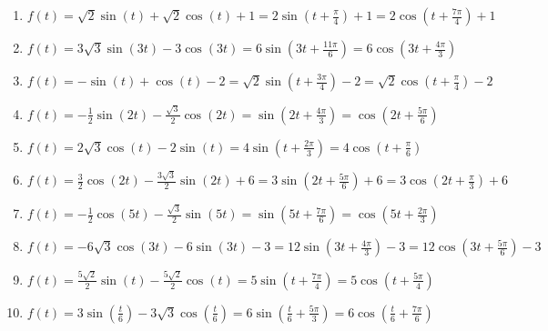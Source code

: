 \documentclass{ximera}
\begin{document}
\begin{enumerate}
\setcounter{enumi}{\value{HW}}
\item $f(t) = \sqrt{2}\sin(t) + \sqrt{2}\cos(t) + 1 = 2\sin\left(t + \frac{\pi}{4}\right) + 1 = 2\cos\left(t + \frac{7\pi}{4}\right) + 1$ 
\item $f(t) = 3\sqrt{3}\sin(3t) - 3\cos(3t) = 6\sin\left(3t + \frac{11\pi}{6}\right) = 6\cos\left(3t + \frac{4\pi}{3}\right)$
\item $f(t) = -\sin(t) + \cos(t) - 2 = \sqrt{2}\sin\left(t + \frac{3\pi}{4}\right) - 2 = \sqrt{2}\cos\left(t + \frac{\pi}{4}\right) - 2$
\item $f(t) = -\frac{1}{2}\sin(2t) - \frac{\sqrt{3}}{2}\cos(2t) = \sin\left(2t + \frac{4\pi}{3}\right) = \cos\left(2t + \frac{5\pi}{6}\right)$
\item $f(t) = 2\sqrt{3} \cos(t) - 2\sin(t) = 4\sin\left(t+\frac{2\pi}{3}  \right)  = 4\cos\left(t + \frac{\pi}{6}\right)$
\item  $f(t) = \frac{3}{2} \cos(2t) - \frac{3\sqrt{3}}{2} \sin(2t) + 6 =3\sin\left(2t + \frac{5\pi}{6}\right) + 6   = 3\cos\left(2t + \frac{\pi}{3}\right) + 6$
\item  $f(t) = -\frac{1}{2} \cos(5t) -\frac{\sqrt{3}}{2} \sin(5t) =  \sin\left(5t + \frac{7\pi}{6}\right) = \cos\left(5t + \frac{2\pi}{3}\right)$
\item  $f(t) = -6\sqrt{3} \cos(3t) - 6\sin(3t) - 3 = 12\sin\left(3t + \frac{4\pi}{3}\right) - 3 = 12\cos\left(3t + \frac{5\pi}{6}\right) - 3$
\item  $f(t) =  \frac{5\sqrt{2}}{2} \sin(t)  -\frac{5\sqrt{2}}{2} \cos(t) = 5\sin\left(t + \frac{7\pi}{4}\right)= 5\cos\left(t + \frac{5\pi}{4}\right)$
\item  $f(t) =3\sin\left(\frac{t}{6}\right) -3\sqrt{3} \cos\left(\frac{t}{6}\right) = 6\sin\left( \frac{t}{6}+\frac{5\pi}{3}\right)= 6\cos\left( \frac{t}{6}+\frac{7\pi}{6}\right) $

\setcounter{HW}{\value{enumi}}
\end{enumerate}
\end{document}
